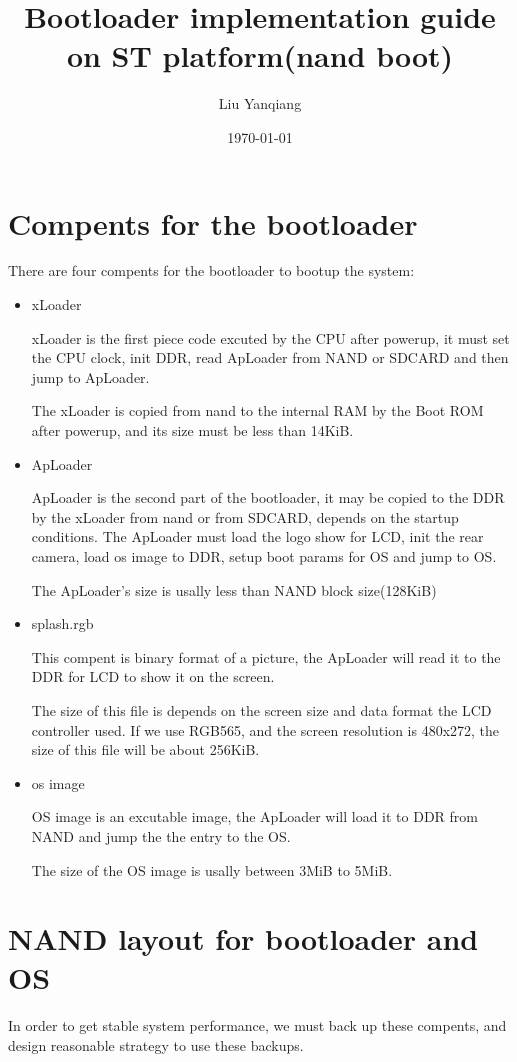 \documentclass[11pt]{article}
\title{Bootloader implementation guide on ST platform(nand boot)}
\author{Liu Yanqiang}
\date{\today}
\begin{document}
\sloppy
\maketitle

\setcounter{section}{0}
\section{Compents for the bootloader}
	There are four compents for the bootloader to bootup the system:
	\begin{itemize}
		\item xLoader

				xLoader is the first piece code excuted by the CPU after powerup, it must
				set the CPU clock, init DDR, read ApLoader from NAND or SDCARD and then
				jump to ApLoader.
				
				The xLoader is copied from nand to the internal RAM by the Boot ROM after 
				powerup, and its size must be less than 14KiB.

		\item ApLoader

				ApLoader is the second part of the bootloader, it may be copied to the DDR 
				by the xLoader from nand or from SDCARD, depends on the startup conditions.
				The ApLoader must load the logo show for LCD, init the rear camera, load os
				image to DDR, setup boot params for OS and jump to OS.

				The ApLoader's size is usally less than NAND block size(128KiB)
				
		\item splash.rgb

				This compent is binary format of a picture, the ApLoader will read it to the
				DDR for LCD to show it on the screen.

				The size of this file is depends on the screen size and data format the LCD
				controller used. If we use RGB565, and the screen resolution is 480x272, the
				size of this file will be about 256KiB.

		\item os image

				OS image is an excutable image, the ApLoader will load it to DDR from NAND and
				jump the the entry to the OS.

				The size of the OS image is usally between 3MiB to 5MiB.
	\end{itemize}

\section{NAND layout for bootloader and OS}
	In order to get stable system performance, we must back up these compents, and design
	reasonable strategy to use these backups.
\end{document}
